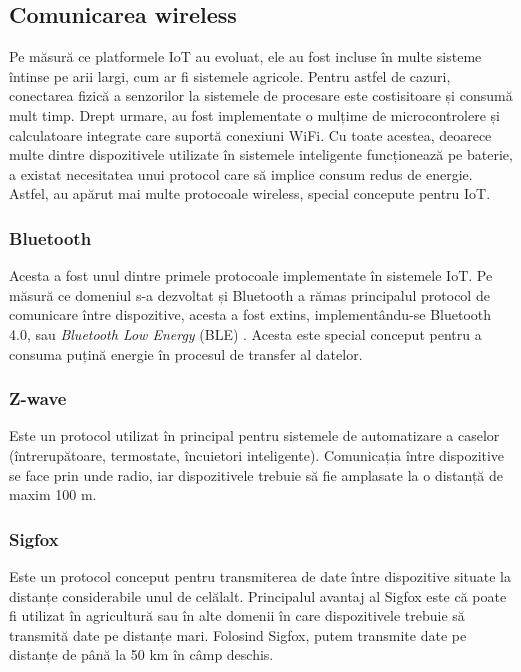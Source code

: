 \subsection{Comunicarea wireless}
\label{sec:embed:bus:wireless}

Pe măsură ce platformele IoT au evoluat, ele au fost incluse în multe sisteme
întinse pe arii largi, cum ar fi sistemele agricole. Pentru astfel de cazuri,
conectarea fizică a senzorilor la sistemele de procesare este costisitoare și
consumă mult timp. Drept urmare, au fost implementate o mulțime de
microcontrolere și calculatoare integrate care suportă conexiuni WiFi. Cu toate
acestea, deoarece multe dintre dispozitivele utilizate în sistemele inteligente
funcționează pe baterie, a existat necesitatea unui protocol care să implice
consum redus de energie. Astfel, au apărut mai multe protocoale wireless,
special concepute pentru IoT.

\subsubsection{Bluetooth}
\label{sec:embed:bus:wireless:bluetooth}

Acesta a fost unul dintre primele protocoale implementate în sistemele IoT. Pe
măsură ce domeniul s-a dezvoltat și Bluetooth a rămas principalul protocol de
comunicare între dispozitive, acesta a fost extins, implementându-se Bluetooth
4.0, sau \textit{Bluetooth Low Energy} (BLE) . Acesta
este special conceput pentru a consuma puțină energie în procesul de transfer al
datelor.

\subsubsection{Z-wave}
\label{sec:embed:bus:wireless:zwave}

Este un protocol utilizat în principal
pentru sistemele de automatizare a caselor (întrerupătoare, termostate,
încuietori inteligente). Comunicația între dispozitive se face prin unde radio,
iar dispozitivele trebuie să fie amplasate la o distanță de maxim 100 m.

\subsubsection{Sigfox}
\label{sec:embed:bus:wireless:sigfox}

Este un protocol conceput
pentru transmiterea de date între dispozitive situate la distanțe considerabile
unul de celălalt. Principalul avantaj al Sigfox este că poate fi utilizat în
agricultură sau în alte domenii în care dispozitivele trebuie să transmită date
pe distanțe mari. Folosind Sigfox, putem transmite date pe distanțe de până la
50 km în câmp deschis.

